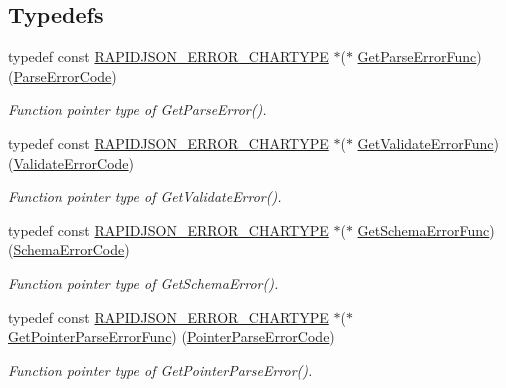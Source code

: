 \subsection*{Typedefs}
\begin{DoxyCompactItemize}
\item 
typedef const \hyperlink{group__RAPIDJSON__ERRORS_ga7e4636fd48d0148f102b8a13f0539d8c}{R\+A\+P\+I\+D\+J\+S\+O\+N\+\_\+\+E\+R\+R\+O\+R\+\_\+\+C\+H\+A\+R\+T\+Y\+PE} $\ast$($\ast$ \hyperlink{group__RAPIDJSON__ERRORS_ga586548166441ab3ce30219cb35be2e04}{Get\+Parse\+Error\+Func}) (\hyperlink{group__RAPIDJSON__ERRORS_ga8d4b32dfc45840bca189ade2bbcb6ba7}{Parse\+Error\+Code})
\begin{DoxyCompactList}\small\item\em Function pointer type of Get\+Parse\+Error(). \end{DoxyCompactList}\item 
typedef const \hyperlink{group__RAPIDJSON__ERRORS_ga7e4636fd48d0148f102b8a13f0539d8c}{R\+A\+P\+I\+D\+J\+S\+O\+N\+\_\+\+E\+R\+R\+O\+R\+\_\+\+C\+H\+A\+R\+T\+Y\+PE} $\ast$($\ast$ \hyperlink{group__RAPIDJSON__ERRORS_ga9e966925692da858e85ecf5c44fe8d38}{Get\+Validate\+Error\+Func}) (\hyperlink{group__RAPIDJSON__ERRORS_ga2e1f88f94a5d9a6817a5de0ed2f0105a}{Validate\+Error\+Code})
\begin{DoxyCompactList}\small\item\em Function pointer type of Get\+Validate\+Error(). \end{DoxyCompactList}\item 
typedef const \hyperlink{group__RAPIDJSON__ERRORS_ga7e4636fd48d0148f102b8a13f0539d8c}{R\+A\+P\+I\+D\+J\+S\+O\+N\+\_\+\+E\+R\+R\+O\+R\+\_\+\+C\+H\+A\+R\+T\+Y\+PE} $\ast$($\ast$ \hyperlink{group__RAPIDJSON__ERRORS_ga27925387f15027c190cfd8411c4a3535}{Get\+Schema\+Error\+Func}) (\hyperlink{group__RAPIDJSON__ERRORS_ga64f496d2cee8c9673f3105ec6008f290}{Schema\+Error\+Code})
\begin{DoxyCompactList}\small\item\em Function pointer type of Get\+Schema\+Error(). \end{DoxyCompactList}\item 
typedef const \hyperlink{group__RAPIDJSON__ERRORS_ga7e4636fd48d0148f102b8a13f0539d8c}{R\+A\+P\+I\+D\+J\+S\+O\+N\+\_\+\+E\+R\+R\+O\+R\+\_\+\+C\+H\+A\+R\+T\+Y\+PE} $\ast$($\ast$ \hyperlink{group__RAPIDJSON__ERRORS_gae35ad6c3a9795985203c66648026e991}{Get\+Pointer\+Parse\+Error\+Func}) (\hyperlink{group__RAPIDJSON__ERRORS_gacb2e274f33e54d91b96e9883a99a98be}{Pointer\+Parse\+Error\+Code})
\begin{DoxyCompactList}\small\item\em Function pointer type of Get\+Pointer\+Parse\+Error(). \end{DoxyCompactList}\end{DoxyCompactItemize}
